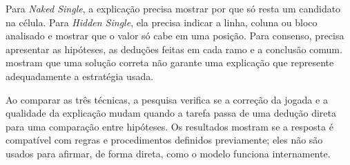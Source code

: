Para \textit{Naked Single}, a explicação precisa mostrar por que só resta um candidato na célula. Para \textit{Hidden Single}, ela precisa indicar a linha, coluna ou bloco analisado e mostrar que o valor só cabe em uma posição. Para consenso, precisa apresentar as hipóteses, as deduções feitas em cada ramo e a conclusão comum.  mostram que uma solução correta não garante uma explicação que represente adequadamente a estratégia usada.

Ao comparar as três técnicas, a pesquisa verifica se a correção da jogada e a qualidade da explicação mudam quando a tarefa passa de uma dedução direta para uma comparação entre hipóteses. Os resultados mostram se a resposta é compatível com regras e procedimentos definidos previamente; eles não são usados para afirmar, de forma direta, como o modelo funciona internamente.

